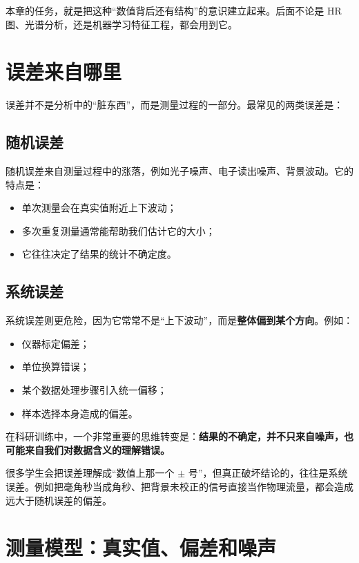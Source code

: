 本章的任务，就是把这种“数值背后还有结构”的意识建立起来。后面不论是 HR 图、光谱分析，还是机器学习特征工程，都会用到它。

\section{误差来自哪里}

误差并不是分析中的“脏东西”，而是测量过程的一部分。最常见的两类误差是：

\subsection{随机误差}

随机误差来自测量过程中的涨落，例如光子噪声、电子读出噪声、背景波动。它的特点是：

\begin{itemize}
    \item 单次测量会在真实值附近上下波动；
    \item 多次重复测量通常能帮助我们估计它的大小；
    \item 它往往决定了结果的统计不确定度。
\end{itemize}

\subsection{系统误差}

系统误差则更危险，因为它常常不是“上下波动”，而是\textbf{整体偏到某个方向}。例如：

\begin{itemize}
    \item 仪器标定偏差；
    \item 单位换算错误；
    \item 某个数据处理步骤引入统一偏移；
    \item 样本选择本身造成的偏差。
\end{itemize}

在科研训练中，一个非常重要的思维转变是：\textbf{结果的不确定，并不只来自噪声，也可能来自我们对数据含义的理解错误。}

\begin{warnbox}[系统误差往往更隐蔽]
很多学生会把误差理解成“数值上那一个 $\pm$ 号”，但真正破坏结论的，往往是系统误差。例如把毫角秒当成角秒、把背景未校正的信号直接当作物理流量，都会造成远大于随机误差的偏差。
\end{warnbox}

\section{测量模型：真实值、偏差和噪声}

